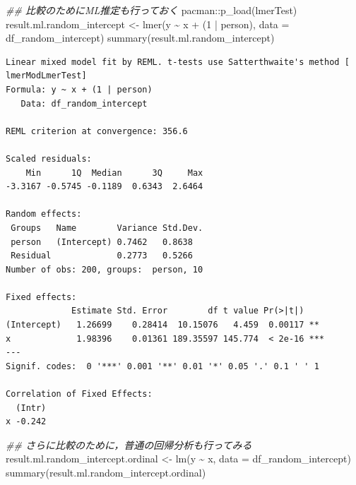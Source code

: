 \documentclass[
  a4paper,
]{ltjsbook}
\newenvironment{Shaded}{\begin{snugshade}}{\end{snugshade}}
\newcommand{\AttributeTok}[1]{\textcolor[rgb]{0.40,0.45,0.13}{#1}}
\newcommand{\DecValTok}[1]{\textcolor[rgb]{0.68,0.00,0.00}{#1}}
\newcommand{\DocumentationTok}[1]{\textcolor[rgb]{0.37,0.37,0.37}{\textit{#1}}}
\newcommand{\FunctionTok}[1]{\textcolor[rgb]{0.28,0.35,0.67}{#1}}
\newcommand{\NormalTok}[1]{\textcolor[rgb]{0.00,0.23,0.31}{#1}}
\newcommand{\OtherTok}[1]{\textcolor[rgb]{0.00,0.23,0.31}{#1}}
\newcommand{\SpecialCharTok}[1]{\textcolor[rgb]{0.37,0.37,0.37}{#1}}
\begin{document}
\begin{Shaded}
\begin{Highlighting}[]
\DocumentationTok{\#\# 比較のためにML推定も行っておく}
\NormalTok{pacman}\SpecialCharTok{::}\FunctionTok{p\_load}\NormalTok{(lmerTest)}
\NormalTok{result.ml.random\_intercept }\OtherTok{\textless{}{-}} \FunctionTok{lmer}\NormalTok{(y }\SpecialCharTok{\textasciitilde{}}\NormalTok{ x }\SpecialCharTok{+}\NormalTok{ (}\DecValTok{1} \SpecialCharTok{|}\NormalTok{ person), }\AttributeTok{data =}\NormalTok{ df\_random\_intercept)}
\FunctionTok{summary}\NormalTok{(result.ml.random\_intercept)}
\end{Highlighting}
\end{Shaded}

\begin{verbatim}
Linear mixed model fit by REML. t-tests use Satterthwaite's method [
lmerModLmerTest]
Formula: y ~ x + (1 | person)
   Data: df_random_intercept

REML criterion at convergence: 356.6

Scaled residuals: 
    Min      1Q  Median      3Q     Max 
-3.3167 -0.5745 -0.1189  0.6343  2.6464 

Random effects:
 Groups   Name        Variance Std.Dev.
 person   (Intercept) 0.7462   0.8638  
 Residual             0.2773   0.5266  
Number of obs: 200, groups:  person, 10

Fixed effects:
             Estimate Std. Error        df t value Pr(>|t|)    
(Intercept)   1.26699    0.28414  10.15076   4.459  0.00117 ** 
x             1.98396    0.01361 189.35597 145.774  < 2e-16 ***
---
Signif. codes:  0 '***' 0.001 '**' 0.01 '*' 0.05 '.' 0.1 ' ' 1

Correlation of Fixed Effects:
  (Intr)
x -0.242
\end{verbatim}

\begin{Shaded}
\begin{Highlighting}[]
\DocumentationTok{\#\# さらに比較のために，普通の回帰分析も行ってみる}
\NormalTok{result.ml.random\_intercept.ordinal }\OtherTok{\textless{}{-}} \FunctionTok{lm}\NormalTok{(y }\SpecialCharTok{\textasciitilde{}}\NormalTok{ x, }\AttributeTok{data =}\NormalTok{ df\_random\_intercept)}
\FunctionTok{summary}\NormalTok{(result.ml.random\_intercept.ordinal)}
\end{Highlighting}
\end{Shaded}
\end{document}
